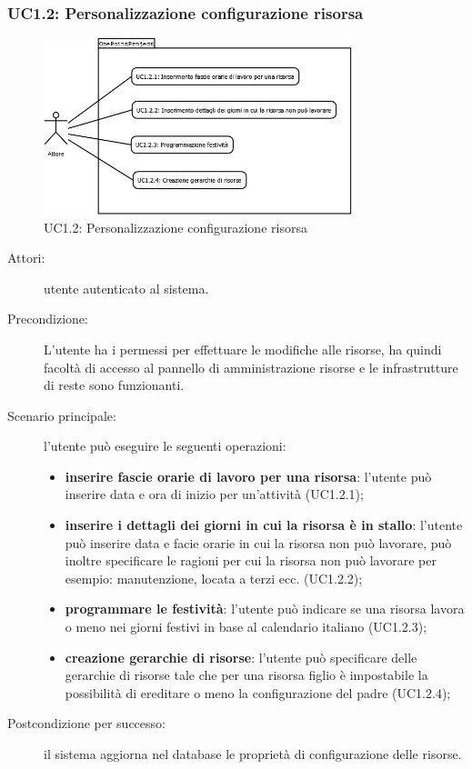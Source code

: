 \subsubsection[UC1.2: Personalizzazione configurazione risorsa]{UC1.2: Personalizzazione configurazione risorsa}
\begin{figure}[H]
\begin{center}
\includegraphics[width=0.80\textwidth]{img/UC/UC1.2.png}
\caption{UC1.2: Personalizzazione configurazione risorsa}
\label{fig:UC1.2}
\end{center}
\end{figure}

\begin{description}
\item[Attori:]{utente autenticato al sistema.}
\item[Precondizione:]{L\textquoteright{}utente ha i permessi per effettuare le modifiche alle risorse, ha quindi facolt\`{a} di accesso al pannello di amministrazione risorse e le infrastrutture di reste sono funzionanti.}
\item[Scenario principale:]{l\textquoteright{}utente pu\`{o} eseguire le seguenti operazioni:
	\begin{itemize}
	\item \textbf{inserire fascie orarie di lavoro per una risorsa}: l\textquoteright{}utente pu\`{o} inserire data e ora di inizio per un\textquoteright{}attivit\`{a} (UC1.2.1);
	\item \textbf{inserire i dettagli dei giorni in cui la risorsa \`{e} in stallo}: l\textquoteright{}utente pu\`{o} inserire data e facie orarie in cui la risorsa non pu\`{o} lavorare, pu\`{o} inoltre specificare le ragioni per cui la risorsa non pu\`{o} lavorare per esempio: manutenzione, locata a terzi ecc. (UC1.2.2);
	\item \textbf{programmare le festivit\`{a}}: l\textquoteright{}utente pu\`{o} indicare se una risorsa lavora o meno nei giorni festivi in base al calendario italiano (UC1.2.3);
	\item \textbf{creazione gerarchie di risorse}: l\textquoteright{}utente pu\`{o} specificare delle gerarchie di risorse tale che per una risorsa figlio \`{e} impostabile la possibilit\`{a} di ereditare o meno la configurazione del padre (UC1.2.4);
	\end{itemize}}
\item[Postcondizione per successo:]{il sistema aggiorna nel database le propriet\`{a} di configurazione delle risorse.}
\end{description}

